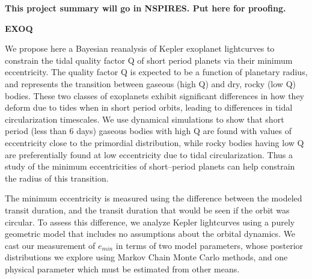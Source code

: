 {\bf This project summary will go in NSPIRES.  Put here for proofing.} \medskip 

\centerline{\bf EXOQ} \medskip 

We propose here a Bayesian reanalysis of Kepler exoplanet lightcurves
to constrain the tidal quality factor Q of short period planets via
their minimum eccentricity.  The quality factor Q is expected to be a
function of planetary radius, and represents the transition between
gaseous (high Q) and dry, rocky (low Q) bodies.  These two classes of
exoplanets exhibit significant differences in how they deform due to
tides when in short period orbits, leading to differences in tidal
circularization timescales.  We use dynamical simulations to show that
short period (less than 6 days) gaseous bodies with high Q are found
with values of eccentricity close to the primordial distribution,
while rocky bodies having low Q are preferentially found at low
eccentricity due to tidal circularization.  Thus a study of the
minimum eccentricities of short--period planets can help constrain the
radius of this transition.

The minimum eccentricity is measured using the difference between the
modeled transit duration, and the transit duration that would be seen
if the orbit was circular.  To assess this difference, we analyze
Kepler lightcurves using a purely geometric model that includes no
assumptions about the orbital dynamics.  We cast our measurement of
$e_{min}$ in terms of two model parameters, whose posterior
distributions we explore using Markov Chain Monte Carlo methods, and
one physical parameter which must be estimated from other means.
